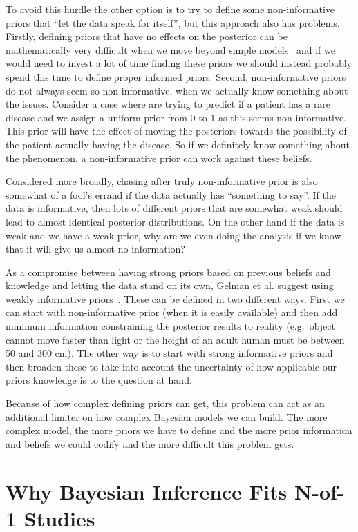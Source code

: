 \documentclass[12pt,a4paper,leqno]{report}
\theoremstyle{plain}
\theoremstyle{definition}
\theoremstyle{remark}
\begin{document}
To avoid this hurdle the other option is to try to define some non-informative
priors that ``let the data speak for itself'', but this approach also has
problems. Firstly, defining priors that have no effects on the posterior can be mathematically
very difficult when we move beyond simple models\ \cite{gelman} and if we would need
to invest a lot of time finding these priors we should instead probably spend this time
to define proper informed priors. Second, non-informative priors do not always
seem so non-informative, when we actually know something about the issues.
Consider a case where are trying to predict if a patient has a rare disease
and we assign a uniform prior from 0 to 1 as this seems non-informative. This
prior will have the effect of moving the posteriors towards the
possibility of the patient actually having the disease. So if we definitely know
something about the phenomenon, a non-informative prior can work against these
beliefs.

Considered more broadly, chasing after truly non-informative prior is also
somewhat of a fool's errand if the data actually has ``something to say''.
If the data is informative, then lots of different priors that are somewhat weak
should lead to almost identical posterior distributions. On the other hand if the data is weak and we
have a weak prior, why are we even doing the analysis if we know that it will
give us almost no information?

As a compromise between having strong priors based on previous beliefs and knowledge and
letting the data stand on its own, Gelman et al.
suggest using weakly informative priors\ \cite{gelman}. These can be defined in two different
ways. First we can start with non-informative prior (when it is easily
available) and then add minimum information constraining the posterior results
to reality (e.g.\ object cannot move faster than light or the height of an adult human
must be between 50 and 300 cm). The other way is to start with strong informative
priors and then broaden these to take into account the uncertainty of
how applicable our priors knowledge is to the question at hand.

Because of how complex defining priors can get, this problem can act as an
additional limiter on how complex Bayesian models we can build. The more complex model, the more priors we
have to define and the more prior information and beliefs we could codify and
the more difficult this problem gets.

\section{Why Bayesian Inference Fits N-of-1 Studies}\label{whybayes}
\end{document}
